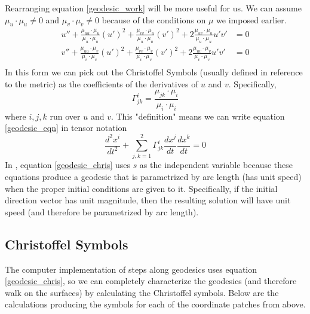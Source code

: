\documentclass{article}
\begin{document}
		Rearranging equation \ref{geodesic_work} will be more useful for us. We can assume $\mu_u \cdot \mu_u \neq 0$  and $\mu_v \cdot \mu_v \neq 0$ because of the conditions on $\mu$ we imposed earlier.
		\begin{equation} \label{geodesic_eqn} \begin{split}
			u'' + \frac{\mu_{uu} \cdot \mu_u}{\mu_u \cdot \mu_u} (u')^2 + \frac{\mu_{vv} \cdot \mu_u}{\mu_u \cdot \mu_u} (v')^2 + 2\frac{\mu_{uv} \cdot \mu_u}{\mu_u \cdot \mu_u} u'v' & = 0 \\
			v'' + \frac{\mu_{uu} \cdot \mu_v}{\mu_v \cdot \mu_v} (u')^2 + \frac{\mu_{vv} \cdot \mu_v}{\mu_v \cdot \mu_v} (v')^2 + 2\frac{\mu_{uv} \cdot \mu_v}{\mu_v \cdot \mu_v} u'v' & = 0 \\
		\end{split} \end{equation}
		In this form we can pick out the Christoffel Symbols (usually defined in reference to the metric) as the coefficients of the derivatives of $u$ and $v$. Specifically,
		\begin{equation}
			\Gamma^i_{jk} = \frac{\mu_{jk} \cdot \mu_i}{\mu_i \cdot \mu_i}
		\end{equation}
		where $i,j,k$ run over $u$ and $v$.
		This "definition" means we can write equation \ref{geodesic_eqn} in tensor notation
		\begin{equation} \label{geodesic_chris}
			\frac{d^2 x^i}{dt^2} + \sum_{j,k = 1}^2 \Gamma^i_{jk} \frac{d x^j}{dt} \frac{dx^k}{dt} = 0
		\end{equation}
		In \cite{BanchoffLovett_DiffGeo_2010}, equation \ref{geodesic_chris} uses $s$ as the independent variable because these equations produce a geodesic that is parametrized by arc length (has unit speed) when the proper initial conditions are given to it.
		Specifically, if the initial direction vector has unit magnitude, then the resulting solution will have unit speed (and therefore be parametrized by arc length).
		
	\subsection{Christoffel Symbols}
		The computer implementation of steps along geodesics uses equation \ref{geodesic_chris}, so we can completely characterize the geodesics (and therefore walk on the surfaces) by calculating the Christoffel symbols.
		Below are the calculations producing the symbols for each of the coordinate patches from above.
		
\end{document}
